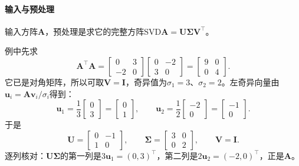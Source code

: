\paragraph{输入与预处理}
输入方阵$\bm A$，预处理是求它的完整方阵SVD$\bm A=\bm U\bm\Sigma\bm V^\top$。

例中先求
\[
 \bm A^\top\bm A=\begin{bmatrix}0&3\\-2&0\end{bmatrix}\begin{bmatrix}0&-2\\3&0\end{bmatrix}=\begin{bmatrix}9&0\\0&4\end{bmatrix}.
\]
它已是对角矩阵，所以可取$\bm V=\bm I$，奇异值为$\sigma_1=3$、$\sigma_2=2$。左奇异向量由$\bm u_i=\bm A\bm v_i/\sigma_i$得到：
\[
 \bm u_1=\frac13\begin{bmatrix}0\\3\end{bmatrix}=\begin{bmatrix}0\\1\end{bmatrix},\qquad
 \bm u_2=\frac12\begin{bmatrix}-2\\0\end{bmatrix}=\begin{bmatrix}-1\\0\end{bmatrix}.
\]
于是
\[
 \bm U=\begin{bmatrix}0&-1\\1&0\end{bmatrix},\qquad
 \bm\Sigma=\begin{bmatrix}3&0\\0&2\end{bmatrix},\qquad
 \bm V=\bm I .
\]
逐列核对：$\bm U\bm\Sigma$的第一列是$3\bm u_1=(0,3)^\top$，第二列是$2\bm u_2=(-2,0)^\top$，正是$\bm A$。

